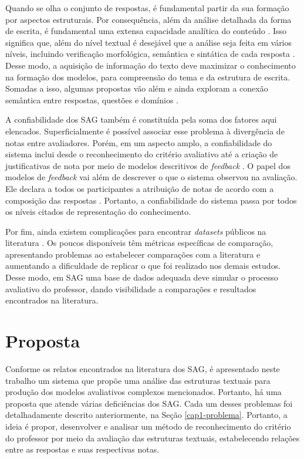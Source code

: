 Quando se olha o conjunto de respostas, é fundamental partir da sua formação por aspectos estruturais. Por consequência, além da análise detalhada da forma de escrita, é fundamental uma extensa capacidade analítica do conteúdo \cite{saha2018}. Isso significa que, além do nível textual é desejável que a análise seja feita em vários níveis, incluindo verificação morfológica, semântica e sintática de cada resposta \cite{sakaguchi2015, riordan2019, sahu2020}. Desse modo, a aquisição de informação do texto deve maximizar o conhecimento na formação dos modelos, para compreensão do tema e da estrutura de escrita. Somadas a isso, algumas propostas vão além e ainda exploram a conexão semântica entre respostas, questões e domínios \cite{dzikovska2013, saha2019}.

A confiabilidade dos SAG também é constituída pela soma dos fatores aqui elencados. Superficialmente é possível associar esse problema à divergência de notas entre avaliadores. Porém, em um aspecto amplo, a confiabilidade do sistema inclui desde o reconhecimento do critério avaliativo até a criação de justificativas de nota por meio de modelos descritivos de \textit{feedback} \cite{kumar2019}. O papel dos modelos de \textit{feedback} vai além de descrever o que o sistema observou na avaliação. Ele declara a todos os participantes a atribuição de notas de acordo com a composição das respostas \cite{marvaniya2018, bernius2022}. Portanto, a confiabilidade do sistema passa por todos os níveis citados de representação do conhecimento.

Por fim, ainda existem complicações para encontrar \textit{datasets} públicos na literatura \cite{burrows2015}. Os poucos disponíveis têm métricas específicas de comparação, apresentando problemas ao estabelecer comparações com a literatura e aumentando a dificuldade de replicar o que foi realizado nos demais estudos. Desse modo, em SAG uma base de dados adequada deve simular o processo avaliativo do professor, dando visibilidade a comparações e resultados encontrados na literatura.


\section{Proposta}
\label{cap1-proposta}

Conforme os relatos encontrados na literatura dos SAG, é apresentado neste trabalho um sistema que propõe uma análise das estruturas textuais para produção dos modelos avaliativos complexos mencionados. Portanto, há uma proposta que atende várias deficiências dos SAG. Cada um desses problemas foi detalhadamente descrito anteriormente, na Seção \ref{cap1-problema}. Portanto, a ideia é propor, desenvolver e analisar um método de reconhecimento do critério do professor por meio da avaliação das estruturas textuais, estabelecendo relações entre as respostas e suas respectivas notas.


